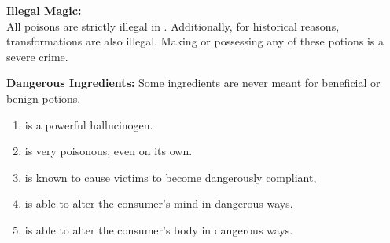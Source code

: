 \documentclass[green]{NeptuneBall}
\begin{document}
{\bf Illegal Magic:}\\
All poisons are strictly illegal in \pAtlantis{}. Additionally, for historical reasons, transformations are also illegal. Making or possessing any of these potions is a severe crime.

{\bf Dangerous Ingredients:}
Some ingredients are never meant for beneficial or benign potions. 
\begin{enumerate}
\item \iHemlock{} is a powerful hallucinogen.  %
\item \iSnails{} is very poisonous, even on its own. %
\item \iPearl{} is  known to cause victims to become dangerously compliant, %
\item \iManOfWar{} is able to alter the consumer's mind in dangerous ways. %
\item \iSquid{} is able to alter the consumer's body in dangerous ways.  %
\end{enumerate}
\end{document}

